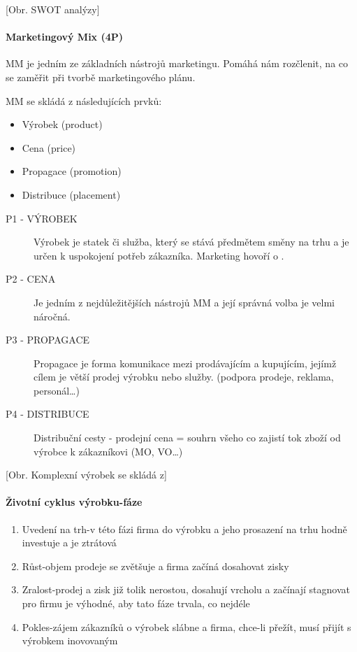 \documentclass[11pt,a4paper,twoside]{book}
\begin{document}
	[Obr. SWOT analýzy]

	\paragraph*{Marketingový Mix (4P)}
	MM je jedním ze základních nástrojů marketingu. Pomáhá nám rozčlenit, na co se zaměřit při tvorbě marketingového plánu.

	MM se skládá z následujících prvků:
	\begin{itemize}
		\item Výrobek (product)
		\item Cena (price)
		\item Propagace (promotion)
		\item Distribuce (placement)
	\end{itemize}

	\begin{description}
		\item[P1 - VÝROBEK] Výrobek je statek či služba, který se stává předmětem směny na trhu a je určen k uspokojení potřeb zákazníka. Marketing hovoří o .
		\item[P2 - CENA] Je jedním z nejdůležitějších nástrojů MM a její správná volba je velmi náročná.
		\item[P3 - PROPAGACE] Propagace je forma komunikace mezi prodávajícím a kupujícím, jejímž cílem je větší prodej výrobku nebo služby. (podpora prodeje, reklama, personál\ldots)
		\item[P4 - DISTRIBUCE] Distribuční cesty - prodejní cena = souhrn všeho co zajistí tok zboží od výrobce k zákazníkovi (MO, VO\ldots)
	\end{description}

	[Obr. Komplexní výrobek se skládá z]

	\paragraph*{Životní cyklus výrobku-fáze}
	\begin{enumerate}
		\item Uvedení na trh-v této fázi firma do výrobku a jeho prosazení na trhu hodně investuje a je ztrátová
		\item Růst-objem prodeje se zvětšuje a firma začíná dosahovat zisky
		\item Zralost-prodej a zisk již tolik nerostou, dosahují vrcholu a začínají stagnovat pro firmu je výhodné, aby tato fáze trvala, co nejdéle
		\item Pokles-zájem zákazníků o výrobek slábne a firma, chce-li přežít, musí přijít s výrobkem inovovaným
	\end{enumerate}
\end{document}
